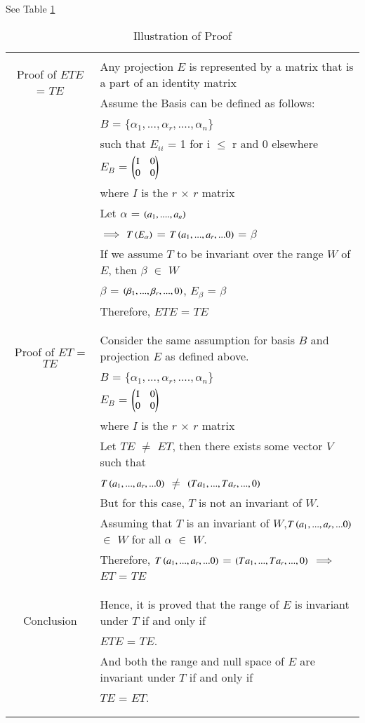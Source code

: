 See Table     \ref{eq:solutions/6/7/1/table:1}
\onecolumn
%
\begin{longtable}{|c|l|}
    \hline
	\multirow{3}{*}{Proof of $ETE$ = $TE$} 
	& \\
	& Any projection $E$ is represented by a matrix that is a part of an identity matrix\\
	& Assume the Basis can be defined as follows:\\
	& $B$ = $\{\alpha_1,...,\alpha_r,....,\alpha_n\}$\\
	& such that $E_{ii}$ = 1 for i $\le$ r and 0 elsewhere\\
	& $E_{B}$ = $\myvec{$I$ & 0 \\ 0 & 0}$\\
	& where $I$ is the $r$ $\times$ $r$ matrix\\
	& Let $\alpha$ = $\left(a_1,....,a_n\right)$\\
	& $\implies$ $T\left(E_{\alpha}\right)$ = $T\left(a_1,...,a_r,...0\right)$ = $\beta$ \\
	& If we assume $T$ to be invariant over the range $W$ of $E$, then $\beta$ $\in$ $W$ \\
	& $\beta$ = $\left(\beta_1,...,\beta_r,...,0\right)$, $E_{\beta}$ = $\beta$\\
	& Therefore, $ETE$ = $TE$ \\
	&\\
	\hline
	\multirow{3}{*}{Proof of $ET$ = $TE$} 
	& \\
	& Consider the same assumption for basis $B$ and projection $E$ as defined above.\\
	& $B$ = $\{\alpha_1,...,\alpha_r,....,\alpha_n\}$\\
	& $E_{B}$ = $\myvec{$I$ & 0 \\ 0 & 0}$\\
	& where $I$ is the $r$ $\times$ $r$ matrix\\
	& Let $TE$ $\ne$ $ET$, then there exists some vector $V$ such that \\
	& $T\left(a_1,...,a_r,...0\right)$ $\ne$ $\left(Ta_1,...,Ta_r,...,0\right)$\\
	& But for this case, $T$ is not an invariant of $W$.\\
	& Assuming that $T$ is an invariant of $W$,$T\left(a_1,...,a_r,...0\right)$ $\in$ $W$ for all $\alpha$ $\in$ $W$.\\
	& Therefore, $T\left(a_1,...,a_r,...0\right)$ = $\left(Ta_1,...,Ta_r,...,0\right)$ $\implies$ $ET$ = $TE$\\
	&\\
	\hline
	\multirow{3}{*}{Conclusion} & \\
	& Hence, it is proved that the range of $E$ is invariant under $T$ if and only if\\
	& $ETE$ = $TE$.\\
	& And both the range and null space of $E$ are invariant under $T$ if and only if\\
	& $TE$ = $ET$.\\
	&\\
	\hline
	\caption{Illustration of Proof}
    \label{eq:solutions/6/7/1/table:1}
\end{longtable}
\twocolumn
